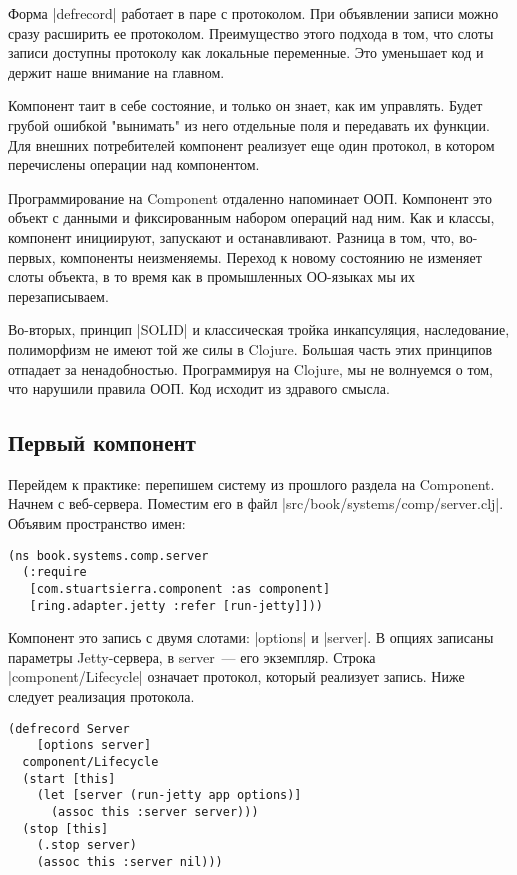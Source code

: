 Форма \spverb|defrecord| работает в паре с протоколом. При объявлении записи можно
сразу расширить ее протоколом. Преимущество этого подхода в том, что слоты
записи доступны протоколу как локальные переменные. Это уменьшает код и держит
наше внимание на главном.

Компонент таит в себе состояние, и только он знает, как им управлять. Будет
грубой ошибкой "вынимать" из него отдельные поля и передавать их функции. Для
внешних потребителей компонент реализует еще один протокол, в котором
перечислены операции над компонентом.

Программирование на Component отдаленно напоминает ООП. Компонент это объект с
данными и фиксированным набором операций над ним. Как и классы, компонент
инициируют, запускают и останавливают. Разница в том, что, во-первых, компоненты
неизменяемы. Переход к новому состоянию не изменяет слоты объекта, в то время
как в промышленных ОО-языках мы их перезаписываем.

Во-вторых, принцип \spverb|SOLID| и классическая тройка инкапсуляция, наследование,
полиморфизм не имеют той же силы в Clojure. Большая часть этих принципов
отпадает за ненадобностью. Программируя на Clojure, мы не волнуемся о том, что
нарушили правила ООП. Код исходит из здравого смысла.

\subsection{Первый компонент}

Перейдем к практике: перепишем систему из прошлого раздела на Component. Начнем
с веб-сервера. Поместим его в файл \spverb|src/book/systems/comp/server.clj|. Объявим
пространство имен:

\begin{verbatim}
(ns book.systems.comp.server
  (:require
   [com.stuartsierra.component :as component]
   [ring.adapter.jetty :refer [run-jetty]]))
\end{verbatim}

Компонент это запись с двумя слотами: \spverb|options| и \spverb|server|. В опциях записаны
параметры Jetty-сервера, в server~--- его экземпляр. Строка \spverb|component/Lifecycle|
означает протокол, который реализует запись. Ниже следует реализация протокола.

\begin{verbatim}
(defrecord Server
    [options server]
  component/Lifecycle
  (start [this]
    (let [server (run-jetty app options)]
      (assoc this :server server)))
  (stop [this]
    (.stop server)
    (assoc this :server nil)))
\end{verbatim}

